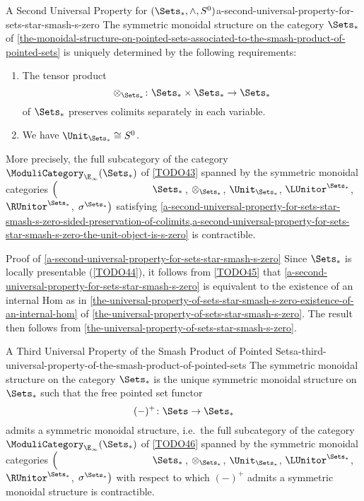 \begin{corollary}{A Second Universal Property for $(\Sets_{*},\wedge,S^{0})$}{a-second-universal-property-for-sets-star-smash-s-zero}%
    The symmetric monoidal structure on the category $\Sets_{*}$ of \cref{the-monoidal-structure-on-pointed-sets-associated-to-the-smash-product-of-pointed-sets} is uniquely determined by the following requirements:
    \begin{enumerate}
        \item\label{a-second-universal-property-for-sets-star-smash-s-zero-sided-preservation-of-colimits}The tensor product
            \[
                \otimes_{\Sets_{*}}%
                \colon
                \Sets_{*}\times\Sets_{*}
                \to
                \Sets_{*}
            \]%
            of $\Sets_{*}$ preserves colimits separately in each variable.
        \item\label{a-second-universal-property-for-sets-star-smash-s-zero-the-unit-object-is-s-zero}We have $\Unit_{\Sets_{*}}\cong S^{0}$.
    \end{enumerate}
    More precisely, the full subcategory of the category $\ModuliCategory_{\E_{\infty}}(\Sets_{*})$ of \cref{TODO43} spanned by the symmetric monoidal categories $\left(\phantom{\mrp{\LUnitor^{\Sets_{*}}}}\Sets_{*}\right.$, $\otimes_{\Sets_{*}}$, $\Unit_{\Sets_{*}}$, $\LUnitor^{\Sets_{*}}$, $\RUnitor^{\Sets_{*}}$, $\left.\sigma^{\Sets_{*}}\right)$ satisfying \cref{a-second-universal-property-for-sets-star-smash-s-zero-sided-preservation-of-colimits,a-second-universal-property-for-sets-star-smash-s-zero-the-unit-object-is-s-zero} is contractible.
\end{corollary}
\begin{Proof}{Proof of \cref{a-second-universal-property-for-sets-star-smash-s-zero}}%
    Since $\Sets_{*}$ is locally presentable (\cref{TODO44}), it follows from \cref{TODO45} that \cref{a-second-universal-property-for-sets-star-smash-s-zero} is equivalent to the existence of an internal Hom as in \cref{the-universal-property-of-sets-star-smash-s-zero-existence-of-an-internal-hom} of \cref{the-universal-property-of-sets-star-smash-s-zero}. The result then follows from \cref{the-universal-property-of-sets-star-smash-s-zero}.
\end{Proof}
\begin{corollary}{A Third Universal Property of the Smash Product of Pointed Sets}{a-third-universal-property-of-the-smash-product-of-pointed-sets}%
    The symmetric monoidal structure on the category $\Sets_{*}$ is the unique symmetric monoidal structure on $\Sets_{*}$ such that the free pointed set functor
    \[
        (-)^{+}
        \colon
        \Sets
        \to
        \Sets_{*}
    \]%
    admits a symmetric monoidal structure, i.e.\ the full subcategory of the category $\ModuliCategory_{\E_{\infty}}(\Sets_{*})$ of \cref{TODO46} spanned by the symmetric monoidal categories $\left(\phantom{\mrp{\LUnitor^{\Sets_{*}}}}\Sets_{*}\right.$, $\otimes_{\Sets_{*}}$, $\Unit_{\Sets_{*}}$, $\LUnitor^{\Sets_{*}}$, $\RUnitor^{\Sets_{*}}$, $\left.\sigma^{\Sets_{*}}\right)$ with respect to which $(-)^{+}$ admits a symmetric monoidal structure is contractible.
\end{corollary}
